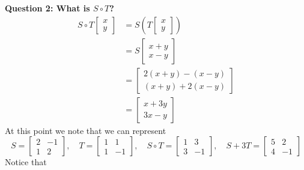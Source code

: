 \documentclass[10pt]{article}
\theoremstyle{definition}
\newcommand{\fl}[1]{\noindent\textbf{#1}}            %
\begin{document}
\fl{Question 2: What is $S\circ T$?}
\begin{align*}
  S\circ T
  \begin{bmatrix}
    x\\y
  \end{bmatrix}
  &=S \left( T
    \begin{bmatrix}
      x\\y
    \end{bmatrix}
  \right)\\ 
  &=S
    \begin{bmatrix}
      x+y\\
      x-y
    \end{bmatrix}\\
  &=
    \begin{bmatrix}
      2(x+y)-(x-y)\\
      (x+y)+2(x-y)
    \end{bmatrix}\\
  &=
    \begin{bmatrix}
      x+3y\\
      3x-y
    \end{bmatrix}
\end{align*}
At this point we note that we can represent
\begin{equation*}
  S
  =
  \begin{bmatrix}
    2&-1\\
    1&2
  \end{bmatrix},
  \quad
  T =
  \begin{bmatrix}
    1&1\\
    1&-1
  \end{bmatrix},
  \quad
  S\circ T
  =
  \begin{bmatrix}
    1&3\\3&-1
  \end{bmatrix},
  \quad
  S+3T
  =
  \begin{bmatrix}
   5&2\\
   4&-1
  \end{bmatrix}
\end{equation*}
Notice that
\end{document}

